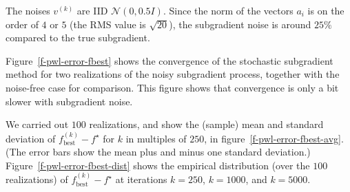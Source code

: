 \documentclass[12pt]{article}
\begin{document}
The noises $v^{(k)}$ are IID $\mathcal N(0,0.5I)$.
Since the norm of the vectors $a_i$ is on the order of $4$ or $5$
(the RMS value is $\sqrt{20}$), the subgradient noise is around
$25\%$ compared to the true subgradient.

Figure~\ref{f-pwl-error-fbest} shows the convergence
of the stochastic subgradient method
for two realizations of the noisy subgradient
process, together with the noise-free case for comparison.
This figure shows that convergence is only a bit slower with
subgradient noise.

We carried out $100$ realizations, and show the (sample)
mean and standard
deviation of $f_\mathrm{best}^{(k)} - f^\star$ for $k$ in multiples
of $250$, in figure~\ref{f-pwl-error-fbest-avg}.
(The error bars show the mean plus and minus one standard deviation.)
Figure~\ref{f-pwl-error-fbest-dist} shows
the empirical distribution
(over the $100$ realizations) of
$f_\mathrm{best}^{(k)} - f^\star$ at
iterations $k=250$, $k=1000$, and $k=5000$.
\end{document}
